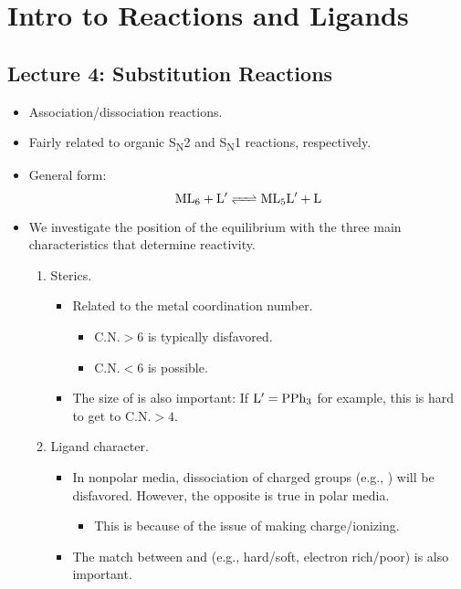 \documentclass[../notes.tex]{subfiles}
\begin{document}
\chapter{Intro to Reactions and Ligands}
\section{Lecture 4: Substitution Reactions}
\begin{itemize}
    \item {}Association/dissociation reactions.
    \item Fairly related to organic S\textsubscript{N}2 and S\textsubscript{N}1 reactions, respectively.
    \item General form:
    \begin{equation*}
        \ce{ML6 + L$'$ <=> ML5L$'$ + L}
    \end{equation*}
    \item We investigate the position of the equilibrium with the three main characteristics that determine reactivity.
    \begin{enumerate}
        \item Sterics.
        \begin{itemize}
            \item Related to the metal coordination number.
            \begin{itemize}
                \item $\text{C.N.}>6$ is typically disfavored.
                \item $\text{C.N.}<6$ is possible.
            \end{itemize}
            \item The size of  is also important: If $\ce{L$'$}=\ce{PPh3}$ for example, this is hard to get to $\text{C.N.}>4$.
        \end{itemize}
        \item Ligand character.
        \begin{itemize}
            \item In nonpolar media, dissociation of charged groups (e.g., ) will be disfavored. However, the opposite is true in polar media.
            \begin{itemize}
                \item This is because of the issue of making charge/ionizing.
            \end{itemize}
            \item The match between  and  (e.g., hard/soft, electron rich/poor) is also important.

\end{itemize}
\end{enumerate}
\end{itemize}
\end{document}
